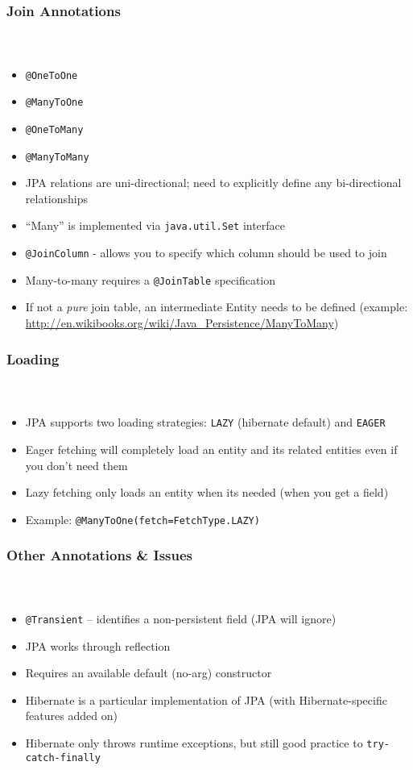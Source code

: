 \documentclass{beamer}
\begin{document}
\begin{frame}[fragile]
  \frametitle{Join Annotations}
  \framesubtitle{~}

\begin{itemize}
  \item \lstinline|@OneToOne|
  \item \lstinline|@ManyToOne|
  \item \lstinline|@OneToMany|
  \item \lstinline|@ManyToMany|
  \item JPA relations are uni-directional; need to explicitly define any bi-directional relationships
  \item ``Many'' is implemented via \lstinline|java.util.Set| interface
  \item \lstinline|@JoinColumn| - allows you to specify which column should be used to join
  \item Many-to-many requires a \lstinline|@JoinTable| specification
  \item If not a \emph{pure} join table, an intermediate Entity needs to be defined (example: \url{http://en.wikibooks.org/wiki/Java_Persistence/ManyToMany})
\end{itemize}

\end{frame}

\begin{frame}[fragile]
  \frametitle{Loading}
  \framesubtitle{~}

\begin{itemize}
  \item JPA supports two loading strategies: \lstinline|LAZY| (hibernate default) and \lstinline|EAGER|
  \item Eager fetching will completely load an entity and its related entities even if you don't need them
  \item Lazy fetching only loads an entity when its needed (when you get a field)
  \item Example: \lstinline|@ManyToOne(fetch=FetchType.LAZY)|
\end{itemize}

\end{frame}

\begin{frame}[fragile]
  \frametitle{Other Annotations \& Issues}
  \framesubtitle{~}

\begin{itemize}
  \item \lstinline|@Transient| -- identifies a non-persistent field (JPA will ignore)
  \item JPA works through reflection
  \item Requires an available default (no-arg) constructor
  \item Hibernate is a particular implementation of JPA (with Hibernate-specific features added on)
  \item Hibernate only throws runtime exceptions, but still good practice to \lstinline|try-catch-finally|
\end{itemize}

\end{frame}
\end{document}

